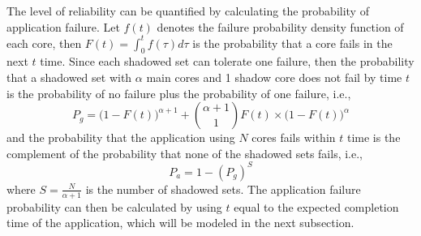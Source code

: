 The level of reliability can be quantified by calculating the probability of application failure.
Let $f(t)$ denotes the failure probability density function of each core, then $F(t) = \int_0^tf(\tau)d\tau$ is the probability that a core fails in the next $t$ time. 
Since each shadowed set can tolerate one failure, 
then the probability that a shadowed set with $\alpha$ main cores and 1 shadow core does not fail by time $t$ is the probability of no failure plus the probability of one failure, i.e., 
\begin{equation}
	P_g = \Big(1-F(t)\Big)^{\alpha+1} + {{\alpha+1} \choose 1}F(t)\times \Big(1-F(t)\Big)^{\alpha}
\end{equation}
and the probability that the application using $N$ cores fails within $t$ time is the complement of the probability that
none of the shadowed sets fails, i.e.,
\begin{equation}
	P_a = 1 - ({P_g})^{S}
\end{equation}
where $S=\frac{N}{\alpha+1}$ is the number of shadowed sets.
The application failure probability can then be calculated by using $t$ equal to the expected completion time of the application, which will be modeled in the next subsection.

